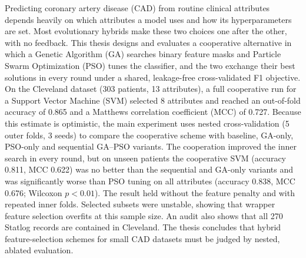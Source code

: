 \documentclass[MTech]{ugthesis}
\begin{document}
\abstract
\begin{onehalfspacing}
\normalfont
{\noindent
Predicting coronary artery disease (CAD) from routine clinical attributes depends heavily on which attributes a model uses and how its hyperparameters are set. Most evolutionary hybrids make these two choices one after the other, with no feedback. This thesis designs and evaluates a cooperative alternative in which a Genetic Algorithm (GA) searches binary feature masks and Particle Swarm Optimization (PSO) tunes the classifier, and the two exchange their best solutions in every round under a shared, leakage-free cross-validated F1 objective. On the Cleveland dataset (303 patients, 13 attributes), a full cooperative run for a Support Vector Machine (SVM) selected 8 attributes and reached an out-of-fold accuracy of 0.865 and a Matthews correlation coefficient (MCC) of 0.727. Because this estimate is optimistic, the main experiment uses nested cross-validation (5 outer folds, 3 seeds) to compare the cooperative scheme with baseline, GA-only, PSO-only and sequential GA--PSO variants. The cooperation improved the inner search in every round, but on unseen patients the cooperative SVM (accuracy 0.811, MCC 0.622) was no better than the sequential and GA-only variants and was significantly worse than PSO tuning on all attributes (accuracy 0.838, MCC 0.676; Wilcoxon $p<0.01$). The result held without the feature penalty and with repeated inner folds. Selected subsets were unstable, showing that wrapper feature selection overfits at this sample size. An audit also shows that all 270 Statlog records are contained in Cleveland. The thesis concludes that hybrid feature-selection schemes for small CAD datasets must be judged by nested, ablated evaluation.
}
\end{onehalfspacing}

\pagebreak

\begin{singlespace}
\tableofcontents
\thispagestyle{empty}

\listoftables
{}
\listoffigures
{}
\end{singlespace}
\end{document}
